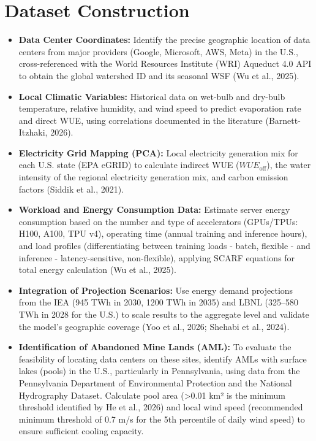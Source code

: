 \documentclass[conference]{IEEEtran}
\begin{document}
\section{Dataset Construction}

\begin{itemize}
\item \textbf{Data Center Coordinates:} Identify the precise geographic location of data centers from major providers (Google, Microsoft, AWS, Meta) in the U.S., cross-referenced with the World Resources Institute (WRI) Aqueduct 4.0 API to obtain the global watershed ID and its seasonal WSF (Wu et al., 2025).

\item \textbf{Local Climatic Variables:} Historical data on wet-bulb and dry-bulb temperature, relative humidity, and wind speed to predict evaporation rate and direct WUE, using correlations documented in the literature (Barnett-Itzhaki, 2026).

\item \textbf{Electricity Grid Mapping (PCA):} Local electricity generation mix for each U.S. state (EPA eGRID) to calculate indirect WUE ($WUE_{\text{off}}$), the water intensity of the regional electricity generation mix, and carbon emission factors (Siddik et al., 2021).

\item \textbf{Workload and Energy Consumption Data:} Estimate server energy consumption based on the number and type of accelerators (GPUs/TPUs: H100, A100, TPU v4), operating time (annual training and inference hours), and load profiles (differentiating between training loads - batch, flexible - and inference - latency-sensitive, non-flexible), applying SCARF equations for total energy calculation (Wu et al., 2025).

\item \textbf{Integration of Projection Scenarios:} Use energy demand projections from the IEA (945 TWh in 2030, 1200 TWh in 2035) and LBNL (325–580 TWh in 2028 for the U.S.) to scale results to the aggregate level and validate the model's geographic coverage (Yoo et al., 2026; Shehabi et al., 2024).

\item \textbf{Identification of Abandoned Mine Lands (AML):} To evaluate the feasibility of locating data centers on these sites, identify AMLs with surface lakes (pools) in the U.S., particularly in Pennsylvania, using data from the Pennsylvania Department of Environmental Protection and the National Hydrography Dataset. Calculate pool area (>0.01 km² is the minimum threshold identified by He et al., 2026) and local wind speed (recommended minimum threshold of 0.7 m/s for the 5th percentile of daily wind speed) to ensure sufficient cooling capacity.
\end{itemize}
\end{document}
